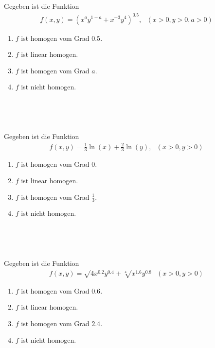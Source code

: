 \subsection*{}
Gegeben ist die Funktion 
\begin{align*}
f(x,y) = \left( x^a y^{1-a} + x^{-3} y^4 \right)^{0.5}, \ \ \
(x > 0, y>0,a>0)
\end{align*}
\renewcommand{\labelenumi}{(\alph{enumi})}
\begin{enumerate}
\item $f$ ist homogen vom Grad $0.5$.
\item $f$ ist linear homogen.
\item $f$ ist homogen vom Grad $a$.
\item $f$ ist nicht homogen.
\end{enumerate}
\ \\
\\
\subsection*{}
Gegeben ist die Funktion 
\begin{align*}
f(x,y) = \frac{1}{3} \ln(x) + \frac{2}{3} \ln(y), \ \ \
(x>0 , y>0 )
\end{align*}
\renewcommand{\labelenumi}{(\alph{enumi})}
\begin{enumerate}
\item $f$ ist homogen vom Grad $0$.
\item $f$ ist linear homogen.
\item $f$ ist homogen vom Grad $\frac{1}{3}$.
\item $f$ ist nicht homogen.
\end{enumerate}
\ \\
\\
\subsection*{}
Gegeben ist die Funktion
\begin{align*}
f(x,y) = 
\sqrt{4  x^{0.2} y^{0.4}} + \sqrt[4]{x^{1.6} y^{0.8}}
\ \ \
(x>0, y>0)
\end{align*}
\renewcommand{\labelenumi}{(\alph{enumi})}
\begin{enumerate}
\item $f$ ist homogen vom Grad $0.6$.
\item $f$ ist linear homogen.
\item $f$ ist homogen vom Grad $2.4$.
\item $f$ ist nicht homogen.
\end{enumerate}
\ \\
\\
